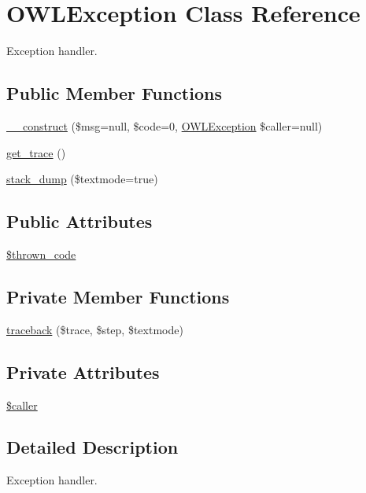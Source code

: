 \hypertarget{classOWLException}{
\section{OWLException Class Reference}
\label{classOWLException}
}
Exception handler.  


\subsection*{Public Member Functions}
\begin{CompactItemize}
\item 
\hyperlink{classOWLException_02821b324b42b7818c3fefe7638444e7}{\_\-\_\-construct} (\$msg=null, \$code=0, \hyperlink{classOWLException}{OWLException} \$caller=null)
\item 
\hyperlink{classOWLException_bec096884c369f08040443561ac3b164}{get\_\-trace} ()
\item 
\hyperlink{classOWLException_cf2b94859fdebcefc22e8a75ac1a670d}{stack\_\-dump} (\$textmode=true)
\end{CompactItemize}
\subsection*{Public Attributes}
\begin{CompactItemize}
\item 
\hyperlink{classOWLException_bd34d579d5f578f2e08a04c987dbea1a}{\$thrown\_\-code}
\end{CompactItemize}
\subsection*{Private Member Functions}
\begin{CompactItemize}
\item 
\hyperlink{classOWLException_6e857cc079ee29428791e4926fe1677a}{traceback} (\$trace, \$step, \$textmode)
\end{CompactItemize}
\subsection*{Private Attributes}
\begin{CompactItemize}
\item 
\hyperlink{classOWLException_f59d0890c1de1187f43084ec617545f1}{\$caller}
\end{CompactItemize}


\subsection{Detailed Description}
Exception handler. 

